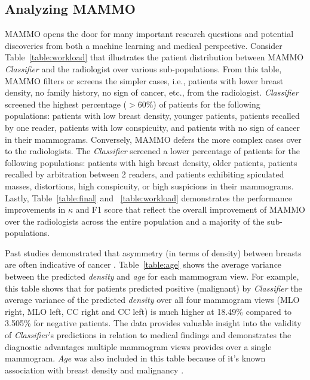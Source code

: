\documentclass[journal]{IEEEtran}
\begin{document}
\subsection{Analyzing MAMMO} 
MAMMO opens the door for many important research questions and potential discoveries from both a machine learning and medical perspective.  Consider Table~\ref{table:workload} that illustrates the patient distribution between MAMMO \textit{Classifier} and the radiologist over various sub-populations.  From this table, MAMMO filters or screens the simpler cases, i.e., patients with lower breast density, no family history, no sign of cancer, etc., from the radiologist.  \textit{Classifier} screened the highest percentage ($>60\%$) of patients for the following populations: patients with low breast density, younger patients, patients recalled by one reader,  patients with low conspicuity, and patients with no sign of cancer in their mammograms. Conversely, MAMMO defers the more complex cases over to the radiologists. The \textit{Classifier} screened a lower percentage of patients for the following populations: patients with high breast density, older patients, patients recalled by arbitration between 2 readers, and patients exhibiting spiculated masses, distortions, high conspicuity, or high suspicions in their mammograms.  Lastly, Table~\ref{table:final} and ~\ref{table:workload} demonstrates the performance improvements in $\kappa$ and F1 score that reflect the overall improvement of MAMMO over the radiologists across the entire population and a majority of the sub-populations. 

Past studies demonstrated that asymmetry (in terms of density) between breasts are often indicative of cancer \cite{breast-asymmetry1, breast-asymmetry2}. Table~\ref{table:age} shows the average variance between the predicted \textit{density} and \textit{age} for each mammogram view.  For example, this table shows that for patients predicted positive (malignant) by \textit{Classifier} the average variance of the predicted \textit{density} over all four mammogram views (MLO right, MLO left, CC right and CC  left) is much higher at  18.49\% compared to 3.505\% for negative patients. The data provides valuable insight into the validity of \textit{Classifier}'s predictions in relation to medical findings and demonstrates the diagnostic advantages multiple mammogram views provides over a single mammogram. \textit{Age} was also included in this table because of it's known association with breast density and malignancy \cite{age-breastdensity, age-breastdensity2}.  
\end{document}
